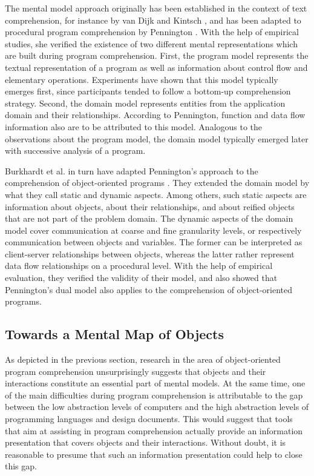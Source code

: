 The mental model approach originally has been established in the context of text comprehension, for instance by van Dijk and Kintsch \cite{van_dijk_strategies_1983}, and has been adapted to procedural program comprehension by Pennington \cite{pennington_comprehension_1987, pennington_stimulus_1987}.
With the help of empirical studies, she verified the existence of two different mental representations which are built during program comprehension.
First, the program model represents the textual representation of a program as well as information about control flow and elementary operations.
Experiments have shown that this model typically emerges first, since participants tended to follow a bottom-up comprehension strategy.
Second, the domain model represents entities from the application domain and their relationships.
According to Pennington, function and data flow information also are to be attributed to this model.
Analogous to the observations about the program model, the domain model typically emerged later with successive analysis of a program.

Burkhardt et al. in turn have adapted Pennington's approach to the comprehension of object-oriented programs \cite{burkhardt_mental_1997}.
They extended the domain model by what they call static and dynamic aspects.
Among others, such static aspects are information about objects, about their relationships, and about reified objects that are not part of the problem domain.
The dynamic aspects of the domain model cover communication at coarse and fine  granularity levels, or respectively communication between objects and variables.
The former can be interpreted as client-server relationships between objects, whereas the latter rather represent data flow relationships on a procedural level.
With the help of empirical evaluation, they verified the validity of their model, and also showed that Pennington's dual model also applies to the comprehension of object-oriented programs.

\subsection{Towards a Mental Map of Objects}
\label{ss:BackgroundComprehensionMentalMap}
As depicted in the previous section, research in the area of object-oriented program comprehension unsurprisingly suggests that objects and their interactions constitute an essential part of mental models.
At the same time, one of the main difficulties during program comprehension is attributable to the gap between the low abstraction levels of computers and the high abstraction levels of programming languages and design documents.
This would suggest that tools that aim at assisting in program comprehension actually provide an information presentation that covers objects and their interactions.
Without doubt, it is reasonable to presume that such an information presentation could help to close this gap.


